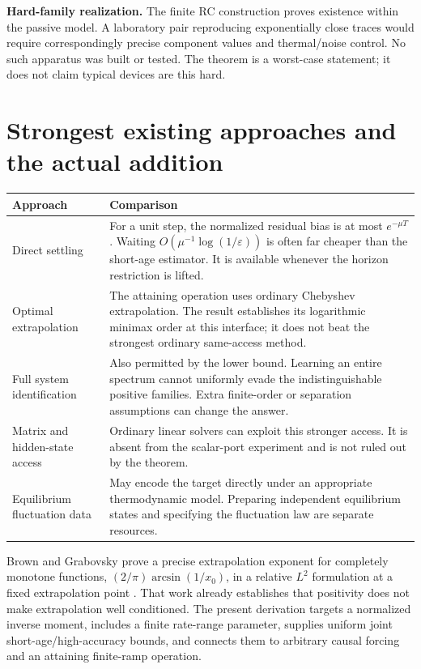 \documentclass[11pt,a4paper]{article}
\begin{document}
\textbf{Hard-family realization.} The finite RC construction proves existence within the passive model. A laboratory pair reproducing exponentially close traces would require correspondingly precise component values and thermal/noise control. No such apparatus was built or tested. The theorem is a worst-case statement; it does not claim typical devices are this hard.

\section{Strongest existing approaches and the actual addition}

\begin{center}\small
\begin{tabular}{p{.24\linewidth}p{.68\linewidth}}
\toprule
Approach&Comparison\\\midrule
Direct settling&For a unit step, the normalized residual bias is at most $e^{-\mu T}$. Waiting $O(\mu^{-1}\log(1/\varepsilon))$ is often far cheaper than the short-age estimator. It is available whenever the horizon restriction is lifted.\\[3pt]
Optimal extrapolation&The attaining operation uses ordinary Chebyshev extrapolation. The result establishes its logarithmic minimax order at this interface; it does not beat the strongest ordinary same-access method.\\[3pt]
Full system identification&Also permitted by the lower bound. Learning an entire spectrum cannot uniformly evade the indistinguishable positive families. Extra finite-order or separation assumptions can change the answer.\\[3pt]
Matrix and hidden-state access&Ordinary linear solvers can exploit this stronger access. It is absent from the scalar-port experiment and is not ruled out by the theorem.\\[3pt]
Equilibrium fluctuation data&May encode the target directly under an appropriate thermodynamic model. Preparing independent equilibrium states and specifying the fluctuation law are separate resources.\\\bottomrule
\end{tabular}
\end{center}

Brown and Grabovsky prove a precise extrapolation exponent for completely monotone functions, $(2/\pi)\arcsin(1/x_0)$, in a relative $L^2$ formulation at a fixed extrapolation point \cite{brown}. That work already establishes that positivity does not make extrapolation well conditioned. The present derivation targets a normalized inverse moment, includes a finite rate-range parameter, supplies uniform joint short-age/high-accuracy bounds, and connects them to arbitrary causal forcing and an attaining finite-ramp operation.
\end{document}
